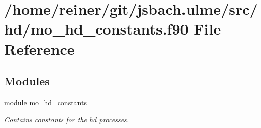 \hypertarget{mo__hd__constants_8f90}{}\section{/home/reiner/git/jsbach.ulme/src/hd/mo\+\_\+hd\+\_\+constants.f90 File Reference}
\label{mo__hd__constants_8f90}
\subsection*{Modules}
\begin{DoxyCompactItemize}
\item 
module \hyperlink{namespacemo__hd__constants}{mo\+\_\+hd\+\_\+constants}
\begin{DoxyCompactList}\small\item\em Contains constants for the hd processes. \end{DoxyCompactList}\end{DoxyCompactItemize}
